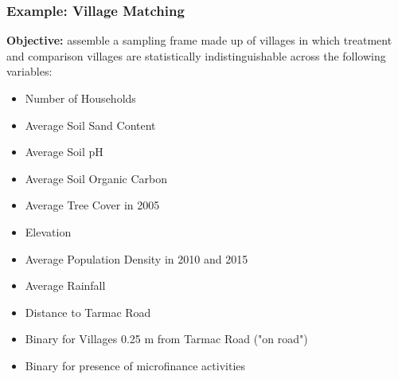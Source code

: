 \documentclass{beamer}
\begin{document}
\begin{frame}
\frametitle{Example: Village Matching}

\textbf{Objective:} assemble a sampling frame made up of villages in which treatment and comparison villages are statistically indistinguishable across the following variables:

\begin{itemize}
\item Number of Households 
\item Average Soil Sand Content \parencite{Vagen2016}
\item Average Soil pH \parencite{Vagen2016}
\item Average Soil Organic Carbon \parencite{Vagen2016}
\item Average Tree Cover in 2005 \parencite{Sexton2013}
\item Elevation \parencite{Jarvis2008, Kruskac}
\item Average Population Density in 2010 and 2015 \parencite{Stevens2015}
\item Average Rainfall \parencite{Funk2015a}
\item Distance to Tarmac Road
\item Binary for Villages 0.25 m from Tarmac Road ("on road")
\item Binary for presence of microfinance activities
\end{itemize}

\end{frame}

\end{document}
